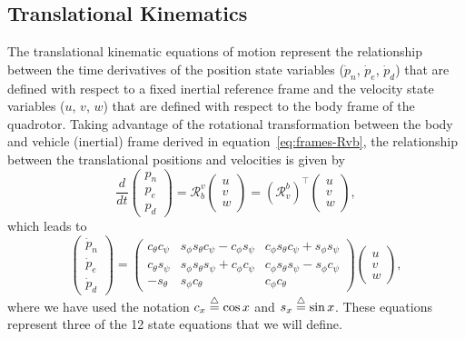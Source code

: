 {\subsection{Translational Kinematics}
The translational kinematic equations of motion represent the relationship between the time derivatives of the position state variables ($\dot{p}_n$, $\dot{p}_e$, $\dot{p}_d$) that are defined with respect to a fixed inertial reference frame and the velocity state variables ($u$, $v$, $w$) that are defined with respect to the body frame of the quadrotor. Taking advantage of the rotational transformation between the body and vehicle (inertial) frame derived in equation~\eqref{eq:frames-Rvb}, the relationship between the translational positions and velocities is given by
\begin{equation*}
\frac{d}{dt} \begin{pmatrix} p_n \\ p_e \\ p_d \end{pmatrix} =
\mathcal{R}_{b}^{v} \begin{pmatrix} u \\ v \\ w \end{pmatrix}
= (\mathcal{R}_{v}^{b})^{\top} \begin{pmatrix} u \\ v \\ w \end{pmatrix} ,
\end{equation*}
which leads to
\begin{equation}
\begin{pmatrix} \dot{p}_n \\ \dot{p}_e \\ \dot{p}_d \end{pmatrix} = \begin{pmatrix} c_{\theta} c_{\psi} & s_{\phi} s_{\theta} c_{\psi} - c_{\phi} s_{\psi}
& c_{\phi} s_{\theta} c_{\psi} + s_{\phi} s_{\psi} \\
c_{\theta} s_{\psi} &  s_{\phi} s_{\theta} s_{\psi} + c_{\phi} c_{\psi}
  & c_{\phi} s_{\theta} s_{\psi} - s_{\phi} c_{\psi}  \\
-s_{\theta} & s_{\phi} c_{\theta} & c_{\phi} c_{\theta}
\end{pmatrix}
\begin{pmatrix} u \\ v \\ w \end{pmatrix},
\label{eq:kin-trans-1}
\end{equation}
where we have used the notation $c_x\stackrel{\triangle}{=}\cos x$ and $s_x\stackrel{\triangle}{=} \sin x$. These equations represent three of the 12 state equations that we will define.

}
